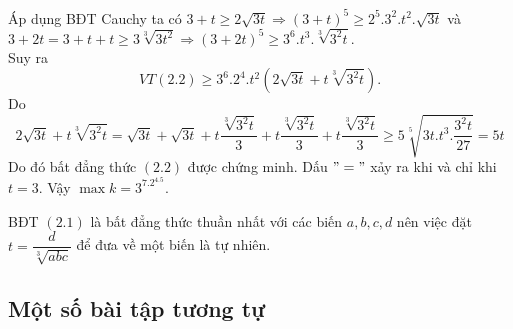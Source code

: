 {\begin{vd}
{		Áp dụng BĐT Cauchy ta có $3+t\geq 2\sqrt{3t}\Rightarrow \left ( 3+t \right )^{5}\geq 2^{5}.3^{2}.t^{2}.\sqrt{3t} $ và $3+2t=3+t+t\geq 3\sqrt[3]{3t^{2}}\Rightarrow \left ( 3+2t \right )^{5}\geq 3^{6}.t^{3}.\sqrt[3]{3^{2}t}.$\\
		Suy ra $$VT(2.2)\geq 3^{6}.2^{4}.t^2\left ( 2\sqrt{3t}+ t\sqrt[3]{3^{2}t}\right ). $$
		Do $$2\sqrt{3t}+ t\sqrt[3]{3^{2}t}=\sqrt{3t}+\sqrt{3t}+t\frac{\sqrt[3]{3^{2}t}}{3}+t\frac{\sqrt[3]{3^{2}t}}{3}+t\frac{\sqrt[3]{3^{2}t}}{3}\geq 5\sqrt[5]{3t.t^{3}.\frac{3^2t}{27}}=5t $$
Do đó bất đẳng thức $(2.2)$ được chứng minh. Dấu $"="$ xảy ra khi và chỉ khi $t=3.$ Vậy $\max k=3^7.2^4.5.$
\begin{nx}
BĐT $(2.1)$ là bất đẳng thức thuần nhất với các biến $a,b,c,d$ nên việc đặt $t=\dfrac{d}{\sqrt[3]{abc}}$ để đưa về một biến là tự nhiên.
\end{nx}
}
\end{vd}


\subsection{Một số bài tập tương tự}

}
